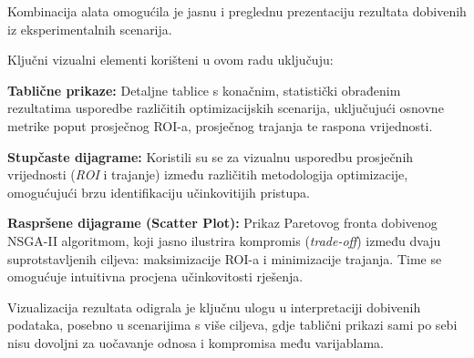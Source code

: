 Kombinacija alata omogućila je jasnu i preglednu prezentaciju rezultata 
dobivenih iz eksperimentalnih scenarija.

Ključni vizualni elementi korišteni u ovom radu uključuju:

    \textbf{Tablične prikaze:} Detaljne tablice s konačnim, statistički obrađenim rezultatima 
    usporedbe različitih optimizacijskih scenarija, uključujući osnovne metrike 
    poput prosječnog ROI-a, prosječnog trajanja te raspona vrijednosti.

    \textbf{Stupčaste dijagrame:} Koristili su se za vizualnu usporedbu prosječnih vrijednosti 
    (\textit{ROI} i trajanje) između različitih metodologija optimizacije, omogućujući brzu identifikaciju 
    učinkovitijih pristupa.

    \textbf{Raspršene dijagrame (Scatter Plot):} Prikaz Paretovog fronta dobivenog NSGA-II algoritmom, 
    koji jasno ilustrira kompromis (\textit{trade-off}) između dvaju suprotstavljenih ciljeva:
    maksimizacije ROI-a i minimizacije trajanja. Time se omogućuje intuitivna procjena 
    učinkovitosti rješenja.

Vizualizacija rezultata odigrala je ključnu ulogu u interpretaciji dobivenih podataka, 
posebno u scenarijima s više ciljeva, gdje tablični prikazi sami po sebi nisu dovoljni 
za uočavanje odnosa i kompromisa među varijablama.

